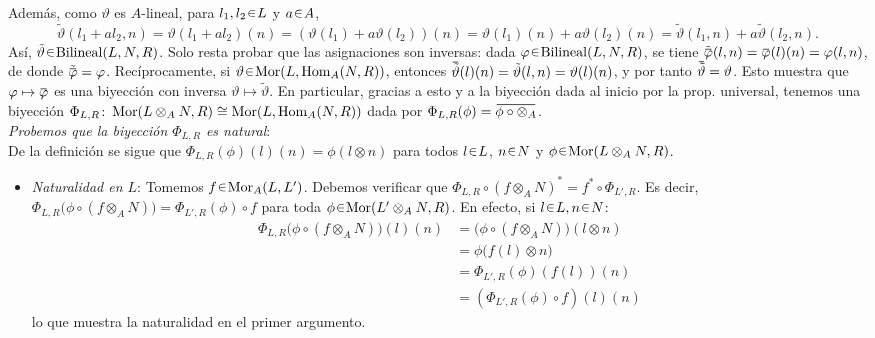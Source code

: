\begin{sol}
\[\]
Además, como $\vartheta$ es $A$-lineal, para $l_1,l_2\en L$ y $a\en A$,
\[
\tilde{\vartheta}(l_1+al_2, n) = \vartheta(l_1+al_2)(n) = (\vartheta(l_1) + a\vartheta(l_2))(n) = \vartheta(l_1)(n) + a\vartheta(l_2)(n) = \tilde{\vartheta}(l_1,n) + a\tilde{\vartheta}(l_2,n).
\]
Así, $\tilde{\vartheta}\en\operatorname{Bilineal}(L,N,R)$. Solo resta probar que las asignaciones son inversas:
dada $\varphi\en\operatorname{Bilineal}(L,N,R)$, se tiene $\tilde{\ubar{\varphi}}(l,n) = \ubar{\varphi}(l)(n) = \varphi(l,n)$, de donde $\tilde{\ubar{\varphi}} = \varphi$. Recíprocamente, si $\vartheta\en\hom(L,\Hom_A(N,R))$, entonces $\ubar{\tilde{\vartheta}}(l)(n) = \tilde{\vartheta}(l,n) = \vartheta(l)(n)$, y por tanto $\ubar{\tilde{\vartheta}} = \vartheta$. Esto muestra que $\varphi\mapsto\ubar{\varphi}$ es una biyección con inversa $\vartheta\mapsto\tilde{\vartheta}$. En particular, gracias a esto y a la biyección dada al inicio por la prop. universal, tenemos una biyección $\Phi_{L,R}\colon\operatorname{Mor}(L\otimes_AN,R) \cong \operatorname{Mor}(L,\operatorname{Hom}_A(N,R))$ dada por $\Phi_{L,R}(\phi) = \ubar{\phi\circ\otimes_A}$.\medskip\\
\emph{Probemos que la biyección $\Phi_{L,R}$ es natural}:\\
De la definición se sigue que $\Phi_{L,R}(\phi)(l)(n) = \phi(l\otimes n)$ para todos $l\en L$, $n\en N$ y $\phi\en\hom(L\otimes_AN,R)$.
\begin{itemize}
    \item\emph{Naturalidad en $L$}: Tomemos $f\en\hom_A(L,L')$. Debemos verificar que $\Phi_{L,R} \circ(f\otimes_AN)^* = f^* \circ \Phi_{L',R}$. Es decir, $\Phi_{L,R}\bigl(\phi\circ(f\otimes_AN)\bigr) = \Phi_{L',R}(\phi)\circ f$ para toda $\phi\en\hom(L'\otimes_AN,R)$. En efecto, si $l\en L,n\en N$:
    \[
    \begin{aligned}
    \Phi_{L,R}\bigl(\phi\circ(f\otimes_AN)\bigr)(l)(n)
    &= \bigl(\phi\circ(f\otimes_AN)\bigr)(l\otimes n)\\
    &= \phi\bigl(f(l)\otimes n\bigr)\\
    &= \Phi_{L',R}(\phi)(f(l))(n)\\
    &= (\Phi_{L',R}(\phi)\circ f)(l)(n)
    \end{aligned}
    \]
    lo que muestra la naturalidad en el primer argumento.


\end{itemize}
\end{sol}
